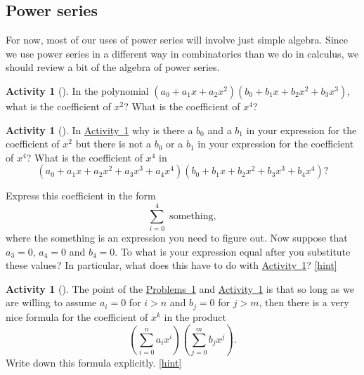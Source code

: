 \documentclass[10pt,]{book}
\theoremstyle{plain}
\theoremstyle{definition}
\theoremstyle{definition}
\theoremstyle{definition}
\newtheorem{activity}[project]{Activity}
\numberwithin{equation}{chapter}
\begin{document}
\subsection[{Power series}]{Power series}\label{subsection-33}
\hypertarget{p-1282}{}%
For now, most of our uses of power series will involve just simple algebra. Since we use power series in a different way in combinatorics than we do in calculus, we should review a bit of the algebra of power series.%
\begin{activity}[]\label{coeffinproduct}
\hypertarget{p-1283}{}%
In the polynomial \((a_0 +a_1x+a_2x^2)(b_0+b_1x+b_2x^2+b_3x^3)\), what is the coefficient of \(x^2\)? What is the coefficient of \(x^4\)?%
\end{activity}
\begin{activity}[]\label{coeffinproduct1}
\hypertarget{p-1285}{}%
In \hyperref[coeffinproduct]{Activity~\ref{coeffinproduct}} why is there a \(b_0\) and a \(b_1\) in your expression for the coefficient of \(x^2\) but there is not a \(b_0\) or a \(b_1\) in your expression for the coefficient of \(x^4\)? What is the coefficient of \(x^4\) in%
\begin{equation*}
(a_0+a_1x+a_2x^2+a_3x^3+a_4x^4)(b_0+b_1x+b_2x^2
+b_3x^3+b_4x^4)?
\end{equation*}
%
\par
\hypertarget{p-1286}{}%
Express this coefficient in the form%
\begin{equation*}
\sum_{i=0}^4 \mbox{ something} ,
\end{equation*}
where the something is an expression you need to figure out. Now suppose that \(a_3=0\), \(a_4=0\) and \(b_4=0\). To what is your expression equal after you substitute these values? In particular, what does this have to do with \hyperref[coeffinproduct]{Activity~\ref{coeffinproduct}}?%
\hfill{\tiny\hyperlink{a-246}{[hint]}\hypertarget{q-246}{}}\end{activity}
\begin{activity}[]\label{coeffinproduct2}
\hypertarget{p-1290}{}%
The point of the \hyperref[coeffinproduct]{Problems~\ref{coeffinproduct}} and \hyperref[coeffinproduct1]{Activity~\ref{coeffinproduct1}} is that so long as we are willing to assume \(a_i=0\) for \(i>n\) and \(b_j =0\) for \(j>m\), then there is a very nice formula for the coefficient of \(x^k\) in the product%
\begin{equation*}
\left(\sum_{i=0}^n a_ix^i\right)\left(\sum_{j=0}^m b_jx^j\right).
\end{equation*}
Write down this formula explicitly.%
\hfill{\tiny\hyperlink{a-247}{[hint]}\hypertarget{q-247}{}}\end{activity}
\end{document}

